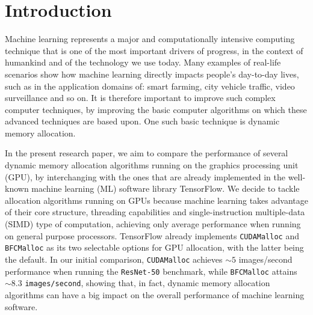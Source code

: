 \documentclass[12pt,twoside]{article}
\begin{document}
\clearpage




\section{Introduction}
\label{sect:introduction}



Machine learning represents a major and computationally intensive computing technique that is one of the most important drivers of progress, in the context of humankind and of the technology we use today. Many examples of real-life scenarios show how machine learning directly impacts people's day-to-day lives, such as in the application domains of: smart farming\todo[inline]{[1 TODO]}, city vehicle traffic\todo[inline]{[2 TODO]}, video surveillance and so on. It is therefore important to improve such complex computer techniques, by improving the basic computer algorithms on which these advanced techniques are based upon. One such basic technique is dynamic memory allocation.

In the present research paper, we aim to compare the performance of several dynamic memory allocation algorithms running on the graphics processing unit (GPU), by interchanging with the ones that are already implemented in the well-known machine learning (ML) software library TensorFlow. We decide to tackle allocation algorithms running on GPUs because machine learning takes advantage of their core structure, threading capabilities and single-instruction multiple-data (SIMD) type of computation, achieving only average performance when running on general purpose processors. TensorFlow already implements \texttt{CUDAMalloc} and \texttt{BFCMalloc} as its two selectable options for GPU allocation, with the latter being the default. In our initial comparison, \texttt{CUDAMalloc} achieves ${\sim}5$ images/second performance when running the \texttt{ResNet-50} benchmark, while \texttt{BFCMalloc} attains ${\sim}8.3$ \texttt{images/second}, showing that, in fact, dynamic memory allocation algorithms can have a big impact on the overall performance of machine learning software.
\end{document}
